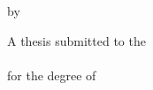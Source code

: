   \makeatletter

\providecommand{\displaytitle}{\@title}
\begin{titlepage}
\begin{center}

  \large %

  {\Huge\textsc{\displaytitle}\par}


  by


  {\huge\textsc{\@author}}



    A thesis submitted to the \\
    \@institution{}\\
     for the degree of\\
  \textsc{\@degree}

  \vfill

  \flushright
    \@institution \\
    \@date

\end{center}
\end{titlepage}
  \makeatother